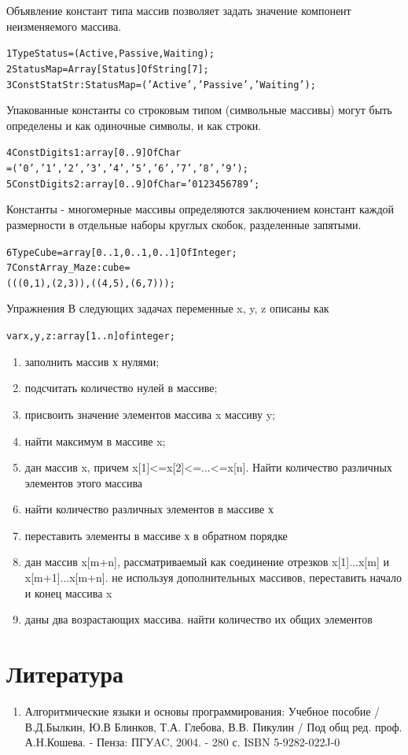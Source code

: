 \documentclass{beamer}
\begin{document}
\begin{frame}[fragile]
Объявление констант типа массив позволяет задать значение компонент неизменяемого массива.
\begin{alltt}
1  Type Status = (Active, Passive, Waiting); 
2    StatusMap = Array [Status] Of String[7];
3  Const StatStr : StatusMap = ('Active', 'Passive', 'Waiting');
\end{alltt}
Упакованные константы со строковым типом (символьные массивы) могут быть определены и как одиночные символы, и как строки.
\begin{alltt}
4  Const Digits1 : array [0..9] Of Char 
         = ('0', '1', '2', '3', '4', '5','6', '7', '8', '9'); 
5  Const Digits2 : array [0..9] Of Char = '0123456789';
\end{alltt}
Константы - многомерные массивы определяются заключением констант каждой размерности в отдельные наборы круглых скобок, разделенные запятыми.
\begin{alltt}
6  Type Cube = array[0..1, 0..1, 0..1] Of Integer;
7  Const Array_Maze : cube = 
     (((0, 1), (2, 3)), ((4, 5), (6, 7)));
\end{alltt}
\end{frame}

\begin{frame}[fragile]{Упражнения}
В следующих задачах переменные x, y, z описаны как 
\begin{alltt}
var x, y, z: array[1..n] of integer;
\end{alltt}
\begin{enumerate}
\item заполнить массив х нулями;
\item подсчитать количество нулей в массиве;
\item присвоить значение элементов массива x массиву y;
\item найти максимум в массиве x;
\item дан массив x, причем x[1]<=x[2]<=...<=x[n]. Найти количество различных элементов этого массива
\item найти количество различных элементов в массиве х
\item переставить элементы в массиве х в обратном порядке
\item дан массив x[m+n], рассматриваемый как соединение отрезков x[1]...x[m] и x[m+1]...x[m+n]. не используя дополнительных массивов, переставить начало и конец массива x
\item даны два возрастающих массива. найти количество их общих элементов
\end{enumerate}
\end{frame}   
   
\section*{Литература}
\begin{frame}   
\begin{enumerate}
\item Алгоритмические языки и основы программирования: Учебное пособие / В.Д.Былкин, Ю.В Блинков, Т.А. Глебова, В.В. Пикулин / Под общ ред. проф. А.Н.Кошева. - Пенза: ПГУAC, 2004. - 280 с. ISBN 5-9282-022J-0
\end{enumerate}
\end{frame}   
\end{document}
